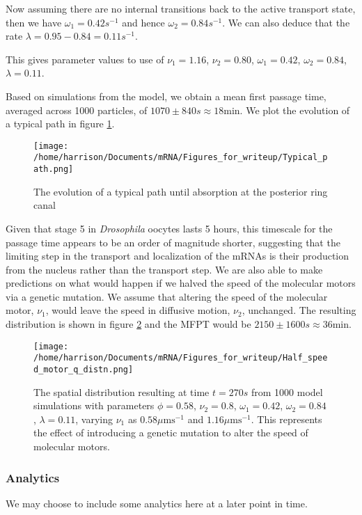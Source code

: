 \documentclass[twocolumn]{biophys}
\begin{document}
Now assuming there are no internal transitions back to the active transport state, then we have $\omega_1 = 0.42 s^{-1}$ and hence $\omega_2 = 0.84 s^{-1}$. 
We can also deduce that the rate $\lambda = 0.95-0.84 = 0.11 s^{-1}$.  

This gives parameter values to use of $\nu_1 = 1.16$, $\nu_2 = 0.80$, $\omega_1 = 0.42 $, $\omega_2 = 0.84$, $\lambda = 0.11$.

Based on simulations from the model, we obtain a mean first passage time, averaged across 1000 particles, of $1070 \pm 840s \approx 18 \text{min}$.
We plot the evolution of a typical path in figure \ref{FIG:Typical_path}.
\begin{figure}[h]
 \centering
 \texttt{[image: /home/harrison/Documents/mRNA/Figures\_for\_writeup/Typical\_path.png]}
 \caption{The evolution of a typical path until absorption at the posterior ring canal}
 \label{FIG:Typical_path}
\end{figure}
Given that stage 5 in \textit{Drosophila} oocytes lasts 5 hours, this timescale for the passage time appears to be an order of magnitude shorter, suggesting that the limiting step in the transport and localization of the mRNAs is their production from the nucleus rather than the transport step.
We are also able to make predictions on what would happen if we halved the speed of the molecular motors via a genetic mutation.
We assume that altering the speed of the molecular motor, $\nu_1$, would leave the speed in diffusive motion, $\nu_2$, unchanged.
The resulting distribution is shown in figure \ref{FIG:Half_speed_q} and the MFPT would be $2150\pm1600s \approx 36\text{min}$.
\begin{figure}[h]
 \centering
 \texttt{[image: /home/harrison/Documents/mRNA/Figures\_for\_writeup/Half\_speed\_motor\_q\_distn.png]}
 \caption{The spatial distribution resulting at time $t=270s$ from 1000 model simulations with parameters $\phi=0.58$, $\nu_2=0.8$, $\omega_1=0.42$, $\omega_2=0.84$, $\lambda=0.11$, varying $\nu_1$ as $0.58\mu \text{ms}^{-1}$ and $1.16\mu \text{ms}^{-1}$. 
 This represents the effect of introducing a genetic mutation to alter the speed of molecular motors.}
 \label{FIG:Half_speed_q}
\end{figure}

\subsubsection{Analytics}
We may choose to include some analytics here at a later point in time.
\end{document}
